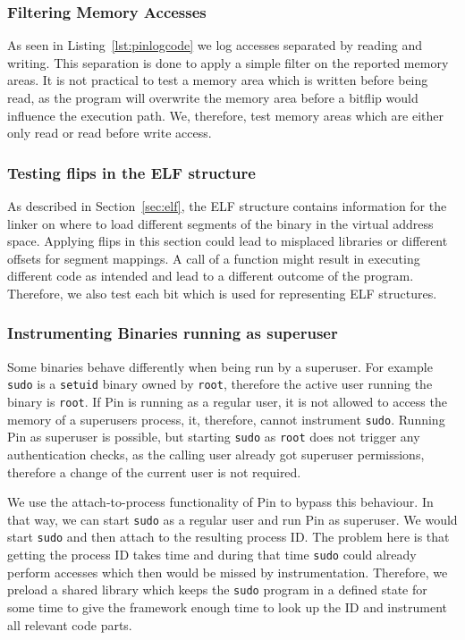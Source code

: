 \subsubsection{Filtering Memory Accesses}

As seen in Listing~\ref{lst:pinlogcode} we log accesses separated by reading and
writing. This separation is done to apply a simple filter on the reported memory
areas. It is not practical to test a memory area which is written before being
read, as the program will overwrite the memory area before a bitflip would
influence the execution path. We, therefore, test memory areas which are either
only read or read before write access.

\subsubsection{Testing flips in the ELF structure}

As described in Section~\ref{sec:elf}, the ELF structure contains information
for the linker on where to load different segments of the binary in the virtual
address space. Applying flips in this section could lead to misplaced libraries
or different offsets for segment mappings. A call of a function might result in
executing different code as intended and lead to a different outcome of the
program. Therefore, we also test each bit which is used for representing ELF
structures.

\subsubsection{Instrumenting Binaries running as superuser}

Some binaries behave differently when being run by a superuser. For example
\texttt{sudo} is a \texttt{setuid} binary owned by \texttt{root}, therefore the
active user running the binary is \texttt{root}. If Pin is running as a regular
user, it is not allowed to access the memory of a superuser\textquotesingle s
process, it, therefore, cannot instrument \texttt{sudo}. Running Pin as
superuser is possible, but starting \texttt{sudo} as \texttt{root} does not
trigger any authentication checks, as the calling user already got superuser
permissions, therefore a change of the current user is not required.

We use the attach-to-process functionality of Pin to bypass this behaviour. In
that way, we can start \texttt{sudo} as a regular user and run Pin as superuser.
We would start \texttt{sudo} and then attach to the resulting process ID. The
problem here is that getting the process ID takes time and during that time
\texttt{sudo} could already perform accesses which then would be missed by
instrumentation. Therefore, we preload a shared library which keeps the
\texttt{sudo} program in a defined state for some time to give the framework
enough time to look up the ID and instrument all relevant code parts.

